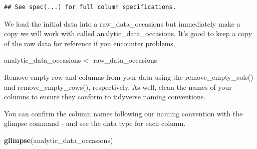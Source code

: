 \documentclass[
]{krantz}
\makeatletter
\newenvironment{Shaded}{\begin{snugshade}}{\end{snugshade}}
\newcommand{\CommentTok}[1]{\textcolor[rgb]{0.37,0.37,0.37}{\textit{#1}}}
\newcommand{\KeywordTok}[1]{\textcolor[rgb]{0.27,0.27,0.27}{\textbf{#1}}}
\newcommand{\NormalTok}[1]{#1}
\newcommand{\OperatorTok}[1]{\textcolor[rgb]{0.43,0.43,0.43}{\textbf{#1}}}
\newcommand{\StringTok}[1]{\textcolor[rgb]{0.5,0.5,0.5}{#1}}
\newenvironment{kframe}{%
\medskip{}
\setlength{\fboxsep}{.8em}
 \def\at@end@of@kframe{}%
 \ifinner\ifhmode%
  \def\at@end@of@kframe{\end{minipage}}%
  \begin{minipage}{\columnwidth}%
 \fi\fi%
 \def\FrameCommand##1{\hskip\@totalleftmargin \hskip-\fboxsep
 \colorbox{shadecolor}{##1}\hskip-\fboxsep
     \hskip-\linewidth \hskip-\@totalleftmargin \hskip\columnwidth}%
 \MakeFramed {\advance\hsize-\width
   \@totalleftmargin\z@ \linewidth\hsize
   \@setminipage}}%
 {\par\unskip\endMakeFramed%
 \at@end@of@kframe}
\renewenvironment{Shaded}{\begin{kframe}}{\end{kframe}}
\makeatother
\begin{document}
\begin{verbatim}
## See spec(...) for full column specifications.
\end{verbatim}

We load the initial data into a raw\_data\_occasions but immediately make a copy we will work with called analytic\_data\_occasions. It's good to keep a copy of the raw data for reference if you encounter problems.

\begin{Shaded}
\begin{Highlighting}[]
\NormalTok{analytic_data_occasions <-}\StringTok{ }\NormalTok{raw_data_occasions}
\end{Highlighting}
\end{Shaded}

Remove empty row and columns from your data using the remove\_empty\_cols() and remove\_empty\_rows(), respectively. As well, clean the names of your columns to ensure they conform to tidyverse naming conventions.

\begin{Shaded}
\end{Shaded}

You can confirm the column names following our naming convention with the glimpse command - and see the data type for each column.

\begin{Shaded}
\begin{Highlighting}[]
\KeywordTok{glimpse}\NormalTok{(analytic_data_occasions)}
\end{Highlighting}
\end{Shaded}
\end{document}
